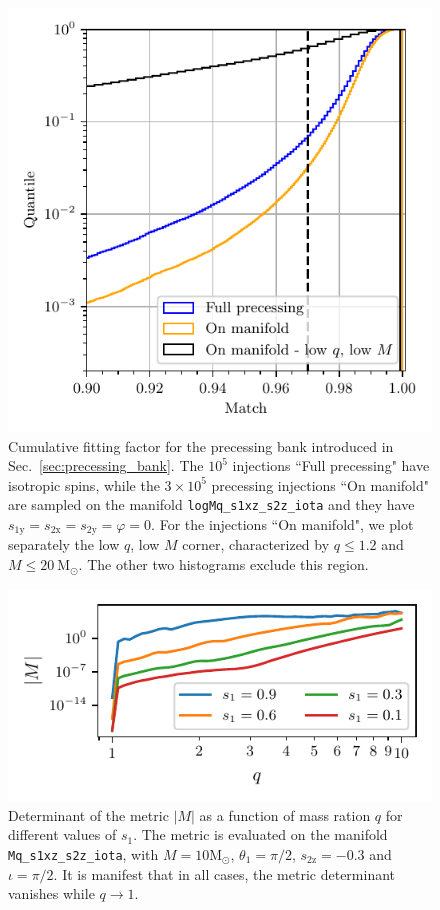 \documentclass[twocolumn,showpacs,preprintnumbers,nofootinbib,prd,
superscriptaddress,10pt]{revtex4-2}
\begin{document}

\begin{figure}[t]
	\centering
	\includegraphics[scale = 1.]{precessing_hist}
	\caption{Cumulative fitting factor for the precessing bank introduced in Sec.~\ref{sec:precessing_bank}. The $10^5$ injections ``Full precessing" have isotropic spins, while the $3\times 10^5$ precessing injections ``On manifold" are sampled on the manifold \texttt{logMq\_s1xz\_s2z\_iota} and they have $s_\text{1y} = s_\text{2x} = s_\text{2y} = \varphi = 0$.
	For the injections ``On manifold", we plot separately the low $q$, low $M$ corner, characterized by $q \leq 1.2$ and $M \leq \SI{20}{\mathrm{M_\odot}}$. The other two histograms exclude this region. }
	\label{fig:precessing_hist}
\end{figure}


\begin{figure}[t]
	\centering
	\includegraphics[scale = 1.]{metric_det_vs_q}
	\caption{Determinant of the metric $|M|$ as a function of mass ration $q$ for different values of $s_1$. The metric is evaluated on the manifold \texttt{Mq\_s1xz\_s2z\_iota}, with $M = 10\mathrm{M_\odot}$, $\theta_1 = \pi/2$, $s_\text{2z} = -0.3$ and $\iota = \pi/2$. It is manifest that in all cases, the metric determinant vanishes while $q \to 1$.}
	\label{fig:metric_vs_q}
\end{figure}
\end{document}
